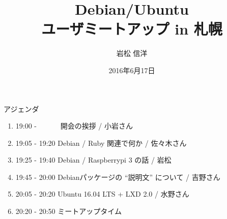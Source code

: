 \newcommand{\textframe}[1]{
	\begin{frame}{}
	\begin{center}
	 {\Huge #1
		  }
	 \end{center}
	 \end{frame}
}


\title{Debian/Ubuntu \\ユーザミートアップ in 札幌}
\author{岩松 信洋}
\date{2016年6月17日}




\begin{frame}
\titlepage{}
\end{frame}

\begin{frame}{アジェンダ}

\begin{enumerate}
\item 19:00 -　　　 開会の挨拶 / 小岩さん
\item 19:05 - 19:20 Debian / Ruby 関連で何か / 佐々木さん
\item 19:25 - 19:40 Debian / Raspberrypi 3 の話 / 岩松
\item 19:45 - 20:00 Debianパッケージの “説明文” について / 吉野さん
\item 20:05 - 20:20 Ubuntu 16.04 LTS + LXD 2.0 / 水野さん
\item 20:20 - 20:50 ミートアップタイム
\end{enumerate}

\end{frame}

